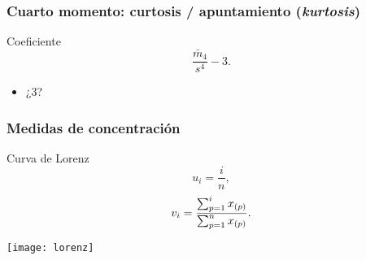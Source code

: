 \documentclass[table]{beamer}
\begin{document}
\begin{frame}
    \frametitle{Cuarto momento: curtosis / apuntamiento (\emph{kurtosis})}
    \begin{block}{Coeficiente}
        \begin{equation*}
            \frac{\bar{m}_{4}}{s^{4}} - 3 .
        \end{equation*}
    \end{block}
    \begin{center}
    \end{center}
    \begin{alertblock}{}
        \begin{itemize}
            \item ¿3?
        \end{itemize}
    \end{alertblock}
\end{frame}

\begin{frame}
    \frametitle{Medidas de concentración}
    \begin{block}{Curva de Lorenz}
        \begin{equation*}
            u_{i} = \frac{i}{n} ,
        \end{equation*}
        \begin{equation*}
            v_{i} = \frac{\sum_{p = 1}^{i} x_{\parens{p}}}{\sum_{p = 1}^{n} x_{\parens{p}}} .
        \end{equation*}
    \end{block}
    \begin{center}
        \texttt{[image: lorenz]}
    \end{center}
\end{frame}
\end{document}

